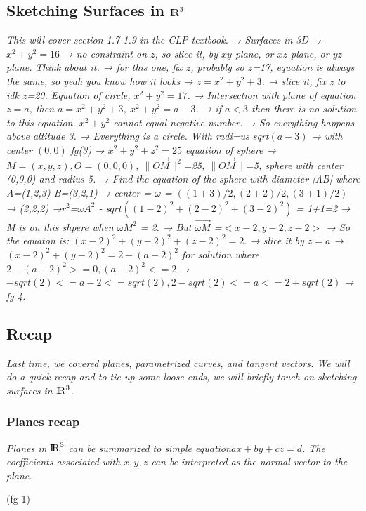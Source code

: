 \documentclass[addpoints]{exam}
\begin{document}
\subsection{
Sketching Surfaces in ${\rm I\!R}^3$
}
\textit{
This will cover section 1.7-1.9 in the CLP textbook. → Surfaces in 3D
	→$ x^2+y^2=16$ → no constraint on $z$, so slice it, by $xy$ plane, or $xz$ plane, or $yz$ plane. Think about it. → for this one, fix $z$, probably so $z$=17, equation is always the same, so yeah you know how it looks
	→ $z=x^2+y^2+3$. → slice it, fix z to idk $z$=20. Equation of circle, $x^2+y^2=17$. 
		→ Intersection with plane of equation $z=a$, then $a=x^2+y^2+3$, $x^2+y^2=a-3$.
		→ if $a<3$ then there is no solution to this equation. $x^2+y^2$ cannot equal negative number.
		→ So everything happens above altitude 3. 
			→ Everything is a circle. With radi=us sqrt$(a-3)$
				→ with center $(0,0)$ fg(3)
	→ $x^2+y^2+z^2 =25$ equation of sphere
		→ $M=(x,y,z), O=(0,0,0)$, $\|\vec{OM}\|^2$=25, $\|\vec{OM}\|$=5, sphere with center (0,0,0) and radius 5.
	→ Find the equation of the sphere with diameter [AB] where A=(1,2,3) B=(3,2,1)
		→ center = $\omega$ = $((1+3)/2,(2+2)/2,(3+1)/2)$ → (2,2,2)
		→$ r^2 $=$\omega A^2$ - s$qrt((1-2)^2+(2-2)^2+(3-2)^2)$ = 1+1=2
		→ M is on this shpere when $\omega M^2$ = 2.
		→ But $\vec{\omega M}$ =$<x-2,y-2,z-2>$
		→ So the equaton is: $(x-2)^2+(y-2)^2 + (z-2)^2 = 2.$
		→ slice it by $z= a$
		→ $(x-2)^2+(y-2)^2=2 - (a-2)^2$ for solution where $2 -(a-2)^2 >=0, (a-2)^2 <=2$
		→ $-sqrt(2)<=a-2<=sqrt(2), 2-sqrt(2)<=a<=2+sqrt(2)$
			→ fg 4.
}

\subsection{
Recap
}
\textit{
Last time, we covered planes, parametrized curves, and tangent vectors.
We will do a quick recap and to tie up some loose ends, we will briefly touch on sketching surfaces in ${\rm I\!R}^3$.
}
\subsubsection{Planes recap}
\textit{
Planes in ${\rm I\!R}^3$ can be summarized to simple equation$ ax + by +cz =d$. The coefficients associated with $x,y,z$ can be interpreted as the normal vector to the plane. 
}

(fg 1)
\end{document}
